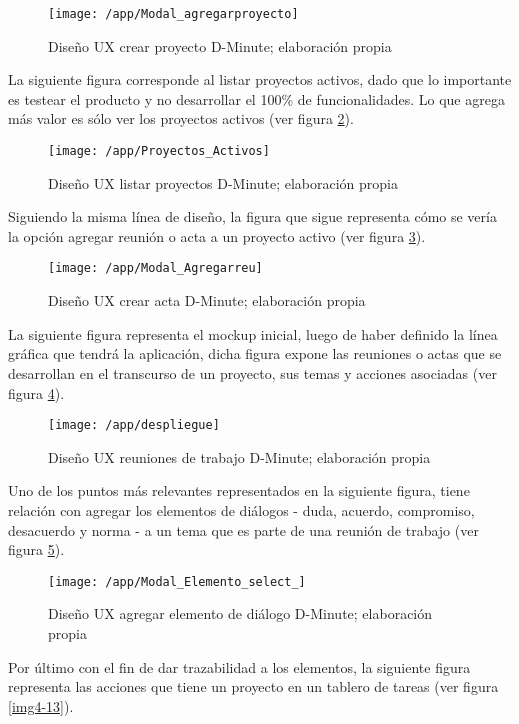 \begin{figure}[!h]
\centering
\texttt{[image: /app/Modal\_agregarproyecto]}
\caption{Diseño UX crear proyecto D-Minute; elaboración propia} 
\label{img4-8}
\end{figure}

La siguiente figura corresponde al listar proyectos activos, dado que lo importante es testear el producto y no desarrollar el 100\% de funcionalidades. Lo que agrega más valor es sólo ver los proyectos activos (ver figura \ref{img4-9}).

\begin{figure}[!h]
\centering
\texttt{[image: /app/Proyectos\_Activos]}
\caption{Diseño UX listar proyectos D-Minute; elaboración propia} 
\label{img4-9}
\end{figure}

Siguiendo la misma línea de dise\~no, la figura que sigue representa cómo se vería la opción agregar reunión o acta a un proyecto activo (ver figura \ref{img4-10}).

\begin{figure}[!h]
\centering
\texttt{[image: /app/Modal\_Agregarreu]}
\caption{Diseño UX crear acta D-Minute; elaboración propia} 
\label{img4-10}
\end{figure}

La siguiente figura representa el mockup inicial, luego de haber definido la línea gráfica que tendrá la aplicación, dicha figura expone las reuniones o actas que se desarrollan en el transcurso de un proyecto, sus temas y acciones asociadas (ver figura \ref{img4-11}).

\begin{figure}[!h]
\centering
\texttt{[image: /app/despliegue]}
\caption{Diseño UX reuniones de trabajo D-Minute; elaboración propia} 
\label{img4-11}
\end{figure}

Uno de los puntos más relevantes representados en la siguiente figura, tiene relación con agregar los elementos de diálogos - duda, acuerdo, compromiso, desacuerdo y norma - a un tema que es parte de una reunión de trabajo (ver figura \ref{img4-12}).

\begin{figure}[!h]
\centering
\texttt{[image: /app/Modal\_Elemento\_select\_]}
\caption{Diseño UX agregar elemento de diálogo D-Minute; elaboración propia} 
\label{img4-12}
\end{figure}

Por último con el fin de dar trazabilidad a los elementos, la siguiente figura representa las acciones que tiene un proyecto en un tablero de tareas (ver figura \ref{img4-13}).

